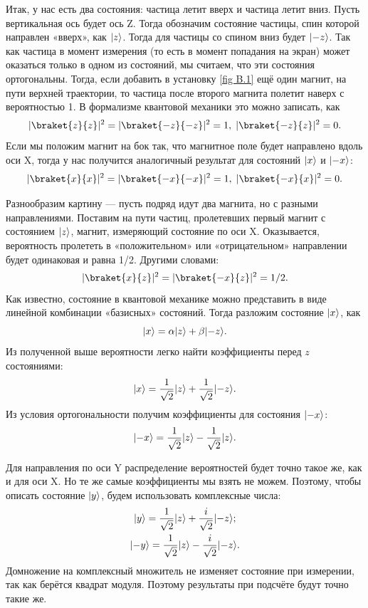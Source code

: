 Итак, у нас есть два состояния: частица летит вверх и частица летит вниз. Пусть
вертикальная ось будет ось Z. Тогда обозначим состояние частицы, спин которой
направлен «вверх», как $\lvert z\rangle$. Тогда для частицы со спином вниз будет
$\lvert-z\rangle$. Так как частица в момент измерения (то есть в момент попадания на
экран) может оказаться только в одном из состояний, мы считаем, что эти
состояния ортогональны. Тогда, если добавить в установку \ref{fig B.1} ещё один
магнит, на пути верхней траектории, то частица после второго магнита полетит
наверх с вероятностью 1. В формализме квантовой механики это можно записать,
как
\[
  |\braket{z}{z}|^2 = |\braket{-z}{-z}|^2 = 1,\; |\braket{-z}{z}|^2 = 0.
\]
Если мы положим магнит на бок так, что магнитное поле будет направлено вдоль
оси X, тогда у нас получится аналогичный результат для состояний $\lvert x\rangle$ и
$\lvert-x\rangle$:
\[
  |\braket{x}{x}|^2 = |\braket{-x}{-x}|^2 = 1,\;|\braket{-x}{x}|^2 = 0.
\]

Разнообразим картину --- пусть подряд идут два магнита, но с разными
направлениями. Поставим на пути частиц, пролетевших первый магнит с состоянием
$\lvert z\rangle$, магнит, измеряющий состояние по оси X. Оказывается, вероятность
пролететь в «положительном» или «отрицательном» направлении будет одинаковая и
равна 1/2. Другими словами:
\[
  |\braket{x}{z}|^2 = |\braket{-x}{z}|^2 = 1/2.
\]
Как известно, состояние в квантовой механике можно представить в виде линейной
комбинации «базисных» состояний. Тогда разложим состояние $\lvert x\rangle$, как
\[
  \lvert x\rangle = \alpha\lvert z\rangle + \beta\lvert-z\rangle.
\]
Из полученной выше вероятности легко найти коэффициенты перед $z$ состояниями:
\[
  \lvert x\rangle = \frac{1}{\sqrt{2}}\lvert z\rangle + \frac{1}{\sqrt{2}}\lvert-z\rangle.
\]
Из условия ортогональности получим коэффициенты для состояния $\lvert-x\rangle$:
\[
  \lvert-x\rangle = \frac{1}{\sqrt{2}}\lvert z\rangle - \frac{1}{\sqrt{2}}\lvert z\rangle.
\]

Для направления по оси Y распределение вероятностей будет точно такое же, как и
для оси X. Но те же самые коэффициенты мы взять не можем. Поэтому, чтобы
описать состояние $\lvert y\rangle$, будем использовать комплексные числа:
\begin{gather*}
  \lvert y\rangle = \frac{1}{\sqrt{2}}\lvert z\rangle + \frac{i}{\sqrt{2}}\lvert-z\rangle;\\
  \lvert-y\rangle = \frac{1}{\sqrt{2}}\lvert z\rangle - \frac{i}{\sqrt{2}}\lvert-z\rangle.
\end{gather*}
Домножение на комплексный множитель не изменяет состояние при измерении, так
как берётся квадрат модуля. Поэтому результаты при подсчёте будут точно такие
же.

